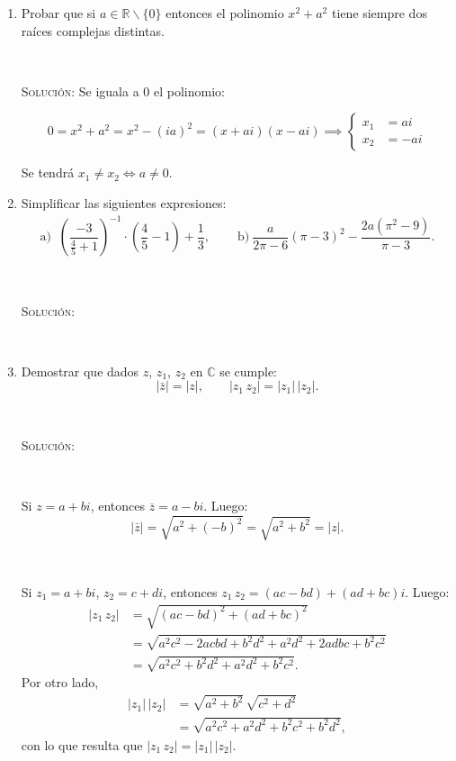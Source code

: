 \documentclass[a4paper,12pt,twoside,spanish,reqno]{amsbook}
\numberwithin{equation}{section}
\newcommand{\rta}{\noindent\textsc{Solución: }}
\newcommand \C{{\mathbb C}}
\begin{document}
\begin{enumerate}
\

\item Probar que si $a\in \mathbb{R} \backslash \{0\} $ entonces el polinomio $x^2+a^2$ tiene siempre dos raíces complejas distintas.

\

\rta Se iguala a $0$ el polinomio:

\begin{equation*}
0 = x^2 + a^2 = x^2 - (ia)^2 = (x+ai)(x-ai) \implies \left\{ \begin{array}{rl}
x_1 &= ai \\
x_2 &= -ai
\end{array} \right.
\end{equation*}

Se tendrá $x_1 \neq x_2 \Leftrightarrow a \neq 0$.

\item
Simplificar las siguientes expresiones:
$$\begin{array}{ll}
 \text{a) } \ \left(\dfrac{-3}{\frac{4}{5}+1}\right)^{-1}\cdot\left(\dfrac{4}{5}-1\right) + \dfrac{1}{3}, \quad &
\text{ b)} \ \dfrac{a}{2\pi-6}(\pi-3)^2 -\dfrac{2a(\pi^2-9)}{\pi-3}.
\end{array}$$
	
\ 

\rta 

\ 


\vspace{.5cm}


\item Demostrar que  dados $z$, $z_1$, $z_2$ en $\C$ se cumple:
\[ |\bar z|= |z|, \qquad |z_1 \, z_2|= |z_1| \, |z_2|. \]

\

\rta 

\

Si $z = a + bi$, entonces $\overline{z} = a - bi$. Luego:
$$
|\bar z| = \sqrt{ a^2  + (-b)^2  }  = \sqrt{ a^2  + b^2  } = |z|. 
$$

\	

Si $z_1 = a + bi$, $z_2 = c + di$, entonces $z_1 \, z_2 = (ac - bd) + (ad + bc)i$. Luego:
\begin{align*}
	|z_1 \, z_2| &= \sqrt{ (ac - bd)^2  + (ad + bc)^2  }  \\
	& = \sqrt{ a^2c^2 -2acbd +b^2d^2  + a^2d^2 +2ad bc +b^2c^2  } \\
	& = \sqrt{ a^2c^2 +b^2d^2  + a^2d^2  +b^2c^2  }. 
\end{align*}
Por otro lado,
\begin{align*}
	|z_1| \, |z_2| &= \sqrt{ a^2 + b^2} \, \sqrt{c^2 +d^2 }  \\
	& = \sqrt{ a^2c^2 + a^2d^2  +b^2c^2 +b^2d^2   },
\end{align*}
con lo que  resulta que $|z_1 \, z_2|= |z_1| \, |z_2|$. 


\end{enumerate}
\end{document}
